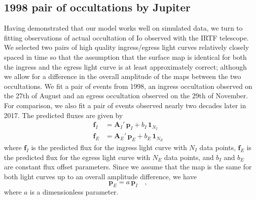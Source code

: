 \documentclass[modern]{aastex62}
\begin{document}
\subsection{1998 pair of occultations by Jupiter}
Having demonstrated that our model works well on simulated data, we turn to fitting observations of actual occultation of Io observed with the IRTF telescope.
We selected two pairs of high quality ingress/egress light curves relatively closely spaced in time so that the assumption that the surface map is identical for both the ingress and the egress light curve is at least approximately correct; although we allow for a difference in the overall amplitude of the maps between the two occultations.
We fit a pair of events from 1998, an ingress occultation observed on the 27th of August and an egress occultation observed on the 29th of November.
For comparison, we also fit a pair of events observed nearly two decades later in 2017.
The predicted fluxes are given by 
\begin{align}
    \mathbf{f}_I&=\mathbf{A}_I'\,\mathbf{p}_I +b_I\,\mathbf{1}_{N_I}\\
    \mathbf{f}_E&=\mathbf{A}_E'\,\mathbf{p}_E +b_E\,\mathbf{1}_{N_E}
\end{align}
where $\mathbf{f}_I$ is the predicted flux for the ingress light curve with $N_I$ data points, $\mathbf{f}_E$ is the predicted flux for the egress light curve with $N_E$ data points, and $b_I$ and $b_E$ are constant flux offset parameters.
Since we assume that the map is the same for both light curves up to an overall amplitude difference, we have
\begin{equation}
    \mathbf{p}_E=a\,\mathbf{p}_I
    \quad,
\end{equation}
where $a$ is a dimensionless parameter.
\end{document}
